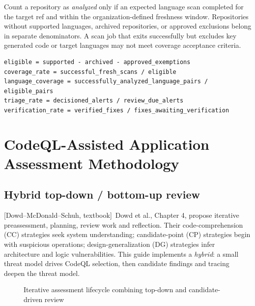 \documentclass[11pt,letterpaper,oneside]{book}
\newcommand{\srcD}{\textsf{[Dowd--McDonald--Schuh, textbook]}}
\begin{document}
Count a repository as \emph{analyzed} only if an expected language scan completed for the target ref and within the organization-defined freshness window. Repositories without supported languages, archived repositories, or approved exclusions belong in separate denominators. A scan job that exits successfully but excludes key generated code or target languages may not meet coverage acceptance criteria.

\begin{lstlisting}[caption={Denominator definitions; handle zero denominator as not applicable}]
eligible = supported - archived - approved_exemptions
coverage_rate = successful_fresh_scans / eligible
language_coverage = successfully_analyzed_language_pairs / eligible_pairs
triage_rate = decisioned_alerts / review_due_alerts
verification_rate = verified_fixes / fixes_awaiting_verification
\end{lstlisting}

\chapter{CodeQL-Assisted Application Assessment Methodology}

\section{Hybrid top-down / bottom-up review}

\srcD\ Dowd et al., Chapter 4, propose iterative preassessment, planning, review work and reflection. Their code-comprehension (CC) strategies seek system understanding; candidate-point (CP) strategies begin with suspicious operations; design-generalization (DG) strategies infer architecture and logic vulnerabilities. This guide implements a \emph{hybrid}: a small threat model drives CodeQL selection, then candidate findings and tracing deepen the threat model.

\begin{figure}[htbp]\centering
{}\caption{Iterative assessment lifecycle combining top-down and candidate-driven review}\label{fig:lifecycle}\end{figure}
\end{document}

